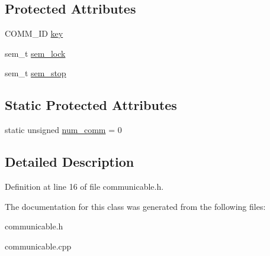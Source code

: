 \subsection*{Protected Attributes}
\begin{CompactItemize}
\item 
\hypertarget{classCommunicable_605b0efeffe81326f216c9903f5bbf4c}{
COMM\_\-ID \hyperlink{classCommunicable_605b0efeffe81326f216c9903f5bbf4c}{key}}
\label{classCommunicable_605b0efeffe81326f216c9903f5bbf4c}

\item 
\hypertarget{classCommunicable_cf9639312f71a2f348bc1e7789ccbd9d}{
sem\_\-t \hyperlink{classCommunicable_cf9639312f71a2f348bc1e7789ccbd9d}{sem\_\-lock}}
\label{classCommunicable_cf9639312f71a2f348bc1e7789ccbd9d}

\item 
\hypertarget{classCommunicable_29c53b9191348e0505e3bcba6d8b82b1}{
sem\_\-t \hyperlink{classCommunicable_29c53b9191348e0505e3bcba6d8b82b1}{sem\_\-stop}}
\label{classCommunicable_29c53b9191348e0505e3bcba6d8b82b1}

\end{CompactItemize}
\subsection*{Static Protected Attributes}
\begin{CompactItemize}
\item 
\hypertarget{classCommunicable_7a6acfdc781a67c9c0ec4f17893f86c3}{
static unsigned \hyperlink{classCommunicable_7a6acfdc781a67c9c0ec4f17893f86c3}{num\_\-comm} = 0}
\label{classCommunicable_7a6acfdc781a67c9c0ec4f17893f86c3}

\end{CompactItemize}


\subsection{Detailed Description}




Definition at line 16 of file communicable.h.

The documentation for this class was generated from the following files:\begin{CompactItemize}
\item 
communicable.h\item 
communicable.cpp\end{CompactItemize}
